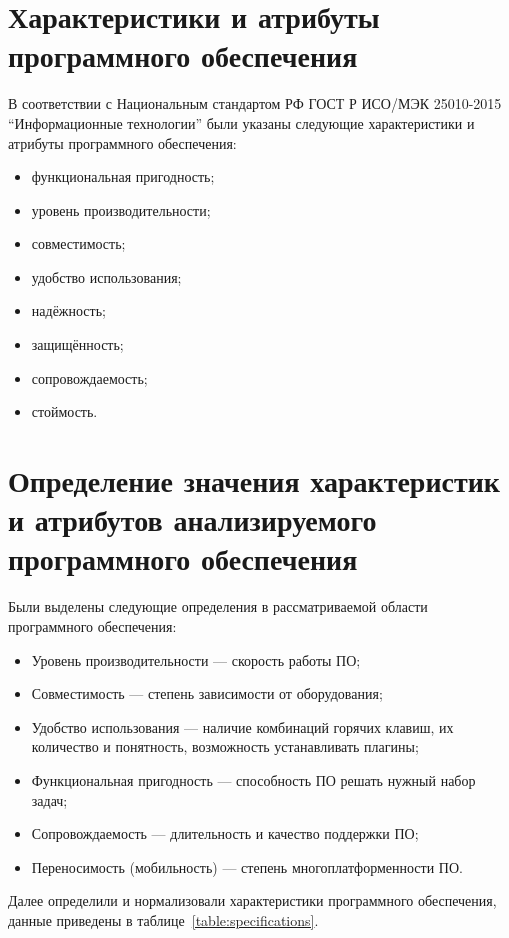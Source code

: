 \section{Характеристики и атрибуты программного
обеспечения}
В соответствии с Национальным стандартом РФ ГОСТ Р ИСО/МЭК 25010-2015
“Информационные технологии” были указаны следующие
характеристики и атрибуты программного обеспечения:
\begin{itemize}
    \item функциональная пригодность;
    \item уровень производительности;
    \item совместимость;
    \item удобство использования;
    \item надёжность;
    \item защищённость;
    \item сопровождаемость;
    \item стоймость.
\end{itemize}

\section[Определение занчений]{Определение значения характеристик
и атрибутов анализируемого программного обеспечения}
Были выделены следующие определения в рассматриваемой области
программного обеспечения:
\begin{itemize}
    \item Уровень производительности --- скорость работы ПО;
    \item Совместимость --- степень зависимости от оборудования;
    \item Удобство использования --- наличие комбинаций горячих клавиш,
    их количество и понятность, возможность устанавливать плагины;
    \item Функциональная пригодность --- способность ПО решать нужный
    набор задач;
    \item Сопровождаемость --- длительность и качество поддержки ПО;
    \item Переносимость (мобильность) --- степень многоплатформенности ПО.
\end{itemize}

Далее определили и нормализовали характеристики программного обеспечения,
данные приведены в таблице~\ref{table:specifications}.

